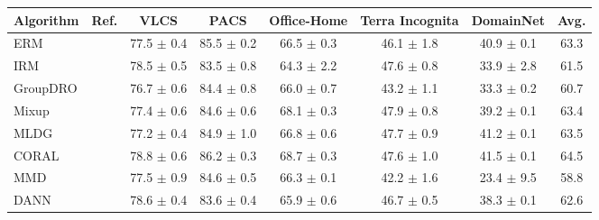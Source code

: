 \begin{table}[t]
\footnotesize
\centering
\begin{tabular}{llcccccc}
\toprule
\textbf{Algorithm}  & \textbf{Ref.}       & \textbf{VLCS}             & \textbf{PACS}             & \textbf{Office-Home}       & \textbf{Terra Incognita}   & \textbf{DomainNet}        & \textbf{Avg.}              \\
\midrule
ERM                       & \citep{vapnik1998statistical}            & 77.5 $\pm$ 0.4            & 85.5 $\pm$ 0.2            & 66.5 $\pm$ 0.3            & 46.1 $\pm$ 1.8            & 40.9 $\pm$ 0.1            & 63.3                     \\
IRM                       & \citep{arjovsky2019invariant}             & 78.5 $\pm$ 0.5            & 83.5 $\pm$ 0.8            & 64.3 $\pm$ 2.2            & 47.6 $\pm$ 0.8            & 33.9 $\pm$ 2.8            & 61.5                      \\
GroupDRO                  & \citep{sagawa2019distributionally}        & 76.7 $\pm$ 0.6            & 84.4 $\pm$ 0.8            & 66.0 $\pm$ 0.7            & 43.2 $\pm$ 1.1            & 33.3 $\pm$ 0.2            & 60.7                      \\
Mixup                     & \citep{yan2020improve}            & 77.4 $\pm$ 0.6            & 84.6 $\pm$ 0.6            & 68.1 $\pm$ 0.3            & 47.9 $\pm$ 0.8            & 39.2 $\pm$ 0.1            & 63.4                      \\
MLDG                      & \citep{LiYSH18}            & 77.2 $\pm$ 0.4            & 84.9 $\pm$ 1.0            & 66.8 $\pm$ 0.6            & 47.7 $\pm$ 0.9            & 41.2 $\pm$ 0.1            & 63.5                      \\
CORAL                     &  \citep{SunS16}             & 78.8 $\pm$ 0.6            & 86.2 $\pm$ 0.3            & 68.7 $\pm$ 0.3            & 47.6 $\pm$ 1.0            & 41.5 $\pm$ 0.1            & 64.5                      \\
MMD                       & \citep{LiPWK18}           & 77.5 $\pm$ 0.9            & 84.6 $\pm$ 0.5            & 66.3 $\pm$ 0.1            & 42.2 $\pm$ 1.6            & 23.4 $\pm$ 9.5            & 58.8                      \\
DANN                      & \citep{GaninUAGLLML16}         & 78.6 $\pm$ 0.4            & 83.6 $\pm$ 0.4            & 65.9 $\pm$ 0.6            & 46.7 $\pm$ 0.5            & 38.3 $\pm$ 0.1            & 62.6                      \\

\end{tabular}
\end{table}
